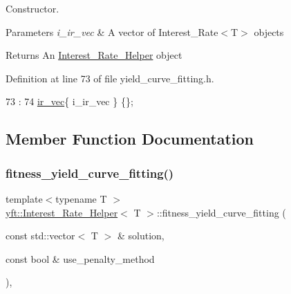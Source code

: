 Constructor. 


\begin{DoxyParams}{Parameters}
{\em i\+\_\+ir\+\_\+vec} & A vector of Interest\+\_\+\+Rate$<$\+T$>$ objects \\
\hline
\end{DoxyParams}
\begin{DoxyReturn}{Returns}
An \hyperlink{classyft_1_1_interest___rate___helper}{Interest\+\_\+\+Rate\+\_\+\+Helper} object 
\end{DoxyReturn}


Definition at line 73 of file yield\+\_\+curve\+\_\+fitting.\+h.


\begin{DoxyCode}
73                                                                           :
74             \hyperlink{classyft_1_1_interest___rate___helper_aaa22a1a41fd5eead9ea61136ebc8446c}{ir\_vec}\{ i\_ir\_vec \} \{\};
\end{DoxyCode}


\subsection{Member Function Documentation}
\mbox{\label{classyft_1_1_interest___rate___helper_ab8f50bcc6788356b008716a44dc134b8}} 
\subsubsection{\texorpdfstring{fitness\+\_\+yield\+\_\+curve\+\_\+fitting()}{fitness\_yield\_curve\_fitting()}}
{\footnotesize\ttfamily template$<$typename T $>$ \\
\hyperlink{classyft_1_1_interest___rate___helper}{yft\+::\+Interest\+\_\+\+Rate\+\_\+\+Helper}$<$ T $>$\+::fitness\+\_\+yield\+\_\+curve\+\_\+fitting (\begin{DoxyParamCaption}\item[{const std\+::vector$<$ T $>$ \&}]{solution,  }\item[{const bool \&}]{use\+\_\+penalty\+\_\+method }\end{DoxyParamCaption})\hspace{0.3cm}{\ttfamily [inline]}, {\ttfamily [private]}}



